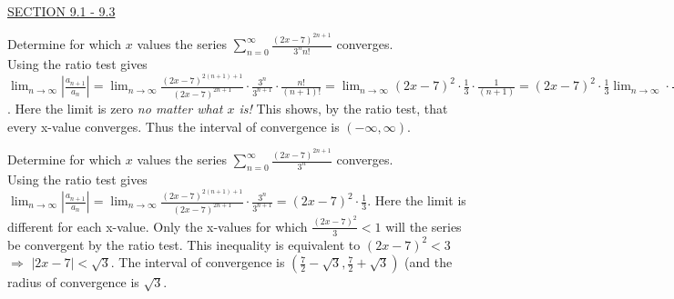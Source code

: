 \documentclass{exam}
\begin{document}
\begin{questions}
\begin{parts}
\end{parts}

\ \\
\underline{SECTION 9.1 - 9.3}

\question Determine for which $x$ values the series $\displaystyle\sum_{n=0}^\infty \frac{(2x-7)^{2n+1}}{3^n n!}$ converges. 
 \\  {\color{red} Using the ratio test gives $\displaystyle\lim_{n\rightarrow\infty} \left| \frac{a_{n+1}}{a_n} \right| = \displaystyle\lim_{n\rightarrow\infty} \frac{(2x-7)^{2(n+1)+1}}{(2x-7)^{2n+1}} \cdot \frac{3^n}{3^{n+1}} \cdot \frac{n!}{(n+1)!}  = \displaystyle\lim_{n\rightarrow\infty} (2x-7)^2\cdot \frac{1}{3} \cdot \frac{1}{(n+1)} = (2x-7)^2\cdot \frac{1}{3} \displaystyle\lim_{n\rightarrow\infty}  \cdot \frac{1}{(n+1)}  = 0 < 1$.  Here the limit is zero {\it no matter what $x$ is!} This shows, by the ratio test, that every x-value converges.  Thus the interval of convergence is $(-\infty, \infty)$. }

\question Determine for which $x$ values the series $\displaystyle\sum_{n=0}^\infty \frac{(2x-7)^{2n+1}}{3^n }$ converges.  
 \\ {\color{red} Using the ratio test gives $\displaystyle\lim_{n\rightarrow\infty} \left| \frac{a_{n+1}}{a_n} \right| = \displaystyle\lim_{n\rightarrow\infty} \frac{(2x-7)^{2(n+1)+1}}{(2x-7)^{2n+1}} \cdot \frac{3^n}{3^{n+1}}   =  (2x-7)^2\cdot \frac{1}{3} $.  Here the limit is different for each x-value.  Only the x-values for which $\frac{(2x-7)^2}{3} < 1$ will the series be convergent by the ratio test.  This inequality is equivalent to $(2x-7)^2<3$ $\Rightarrow$ $|2x-7| < \sqrt{3}$.  The interval of convergence is $\left( \frac{7}{2} - \sqrt{3}, \frac{7}{2} + \sqrt{3}\right)$ (and the radius of convergence is $\sqrt{3}$.}


\end{questions}
\end{document}
